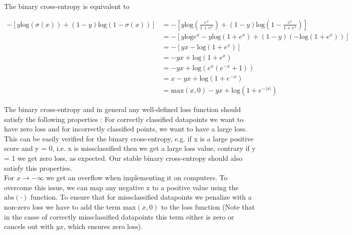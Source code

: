 \documentclass[11pt]{article}
\newcommand{\exercise}{\section{}}
\begin{document}
\exercise

The binary cross-entropy is equivalent to

\begin{align*}
-[y \text{log}(\sigma(x)) + (1 - y) \text{log}(1 - \sigma(x)) ] &= -[y \text{log}(\frac{e^x}{1 + e^x}) + (1 - y) \text{log}(1 - \frac{e^x}{1 + e^x}) ] \\
&= -[ y \text{log}e^x -y \text{log}(1 + e^x) + (1 - y)( -\text{log}(1 + e^x ))] \\
&= -[yx - \text{log}(1 + e^x )] \\
&= -yx + \text{log}(1 + e^x ) \\
&= -yx + \text{log}(e^x(e^{-x} + 1 )) \\
&= x -yx + \text{log}( 1 + e^{-x} ) \\
&= \text{max}(x,0) -yx + \text{log}( 1 + e^{-|x|} ) \tag{see below}
\end{align*}

\noindent The binary cross-entropy and in general any well-defined loss function should satisfy the following properties : For correctly classified datapoints we want to have zero loss and for incorrectly classified points, we want to have a large loss. This can be easily verified for the binary cross-entropy, e.g. if x is a large positive score and y = 0, i.e. x is missclassified then we get a large loss value, contrary if y = 1 we get zero loss, as expected. Our stable binary cross-entropy should also satisfy this properties.
\\
\noindent For $x \rightarrow -\infty$ we get an overflow  when implementing it on computers. To overcome this issue, we can map any negative x to a positive value using the $\text{abs}(\cdot)$ function. To ensure that for missclassified datapoints we penalize with a non-zero loss we have to add the term $\text{max}(x, 0)$ to the loss function (Note that in the casse of correctly missclassified datapoints this term either is zero or cancels out with $yx$, which ensures zero loss).
\end{document}

